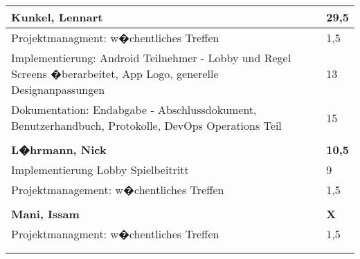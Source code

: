 \documentclass[a4paper,11pt]{scrartcl}
\begin{document}
\begin{longtable}{| p{13.8cm} | C{2.4cm} |}
	\textbf{Kunkel, Lennart} & \textbf{29,5}\\ %
	\hline

  Projektmanagment: w�chentliches Treffen
	&
  1,5
	\\
	\hline

  Implementierung: Android Teilnehmer - Lobby und Regel Screens �berarbeitet, App Logo, generelle Designanpassungen
	&
  13
	\\
	\hline

  Dokumentation: Endabgabe - Abschlussdokument, Benutzerhandbuch, Protokolle, DevOps Operations Teil
	&
  15
	\\
	\hline


	&

	\\
	\hline
	\hline


	\textbf{L�hrmann, Nick} & \textbf{10,5}\\ %
	\hline

	Implementierung Lobby Spielbeitritt
	&
	9
	\\
	\hline

	Projektmanagement: w�chentliches Treffen
	&
  1,5
	\\
	\hline


	&

	\\
	\hline
	\hline


	\textbf{Mani, Issam} & \textbf{X}\\ %
	\hline

  Projektmanagment: w�chentliches Treffen
	&
  1,5
	\\
	\hline


	&

	\\
	\hline


	&

	\\
	\hline


\end{longtable}
\end{document}
